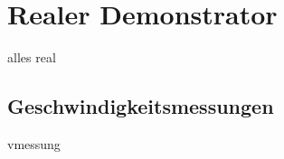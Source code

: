 \chapter{Realer Demonstrator}  
\label{ch:realer demonstrator}
alles real

\section{Geschwindigkeitsmessungen}
\label{sect:geschwindigkeitsmessungen}
vmessung
